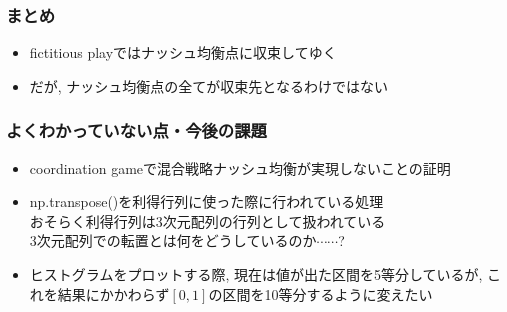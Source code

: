 \documentclass[dvipdfmx,fleqn,handout]{beamer}
\begin{document}
\begin{frame}
\frametitle{まとめ}
\begin{itemize}\setlength{\parskip}{0.5em}
\item
fictitious playではナッシュ均衡点に収束してゆく\pause
\item
だが, ナッシュ均衡点の全てが収束先となるわけではない
\end{itemize}
\end{frame}

\begin{frame}
\frametitle{よくわかっていない点・今後の課題}
\begin{itemize}\setlength{\parskip}{0.5em}
\item
coordination gameで混合戦略ナッシュ均衡が実現しないことの証明\pause
\item
np.transpose()を利得行列に使った際に行われている処理\pause\\
おそらく利得行列は3次元配列の行列として扱われている\\
3次元配列での転置とは何をどうしているのか$\cdots\cdots$?
\item
ヒストグラムをプロットする際, 現在は値が出た区間を5等分しているが, これを結果にかかわらず$[0,1]$の区間を10等分するように変えたい

\end{itemize}
\end{frame}
\end{document}
